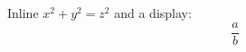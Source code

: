 \documentclass{article}
\begin{document}
Inline $x^2 + y^2 = z^2$ and a display:
\[ \frac{a}{b} \]
\end{document}
